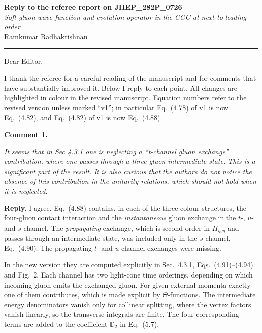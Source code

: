 \documentclass[11pt,a4paper]{article}
\newenvironment{comment}[1]{\par\medskip\noindent\textbf{Comment #1.}\par\vspace{2pt}%
  \begin{list}{}{\leftmargin=12pt\rightmargin=12pt}\item\itshape\small}{\end{list}\vspace{-2pt}}
\newcommand{\reply}{\noindent\textbf{Reply.} }
\begin{document}
\begin{center}
{\large\bfseries Reply to the referee report on JHEP\_282P\_0726}\\[3pt]
\emph{Soft gluon wave function and evolution operator in the CGC at next-to-leading order}\\[2pt]
Ramkumar Radhakrishnan
\end{center}
\vspace{-4pt}\hrule\vspace{6pt}

Dear Editor,

I thank the referee for a careful reading of the manuscript and for comments that have substantially improved it. Below I reply to each point. All changes are highlighted in colour in the revised manuscript. Equation numbers refer to the revised version unless marked ``v1''; in particular Eq.~(4.78) of v1 is now Eq.~(4.82), and Eq.~(4.82) of v1 is now Eq.~(4.88).

\begin{comment}{1}
It seems that in Sec 4.3.1 one is neglecting a ``t-channel gluon exchange'' contribution, where one passes through a three-gluon intermediate state. This is a significant part of the result. It is also curious that the authors do not notice the absence of this contribution in the unitarity relations, which should not hold when it is neglected.
\end{comment}

\reply I agree. Eq.~(4.88) contains, in each of the three colour structures, the four-gluon contact interaction and the \emph{instantaneous} gluon exchange in the $t$-, $u$- and $s$-channel. The \emph{propagating} exchange, which is second order in $H_{ggg}$ and passes through an intermediate state, was included only in the $s$-channel, Eq.~(4.90). The propagating $t$- and $u$-channel exchanges were missing.

In the new version they are computed explicitly in Sec.~4.3.1, Eqs.~(4.91)--(4.94) and Fig.~2. Each channel has two light-cone time orderings, depending on which incoming gluon emits the exchanged gluon. For given external momenta exactly one of them contributes, which is made explicit by $\Theta$-functions. The intermediate energy denominators vanish only for collinear splitting, where the vertex factors vanish linearly, so the transverse integrals are finite. The four corresponding terms are added to the coefficient $\mathbb{D}_{2}$ in Eq.~(5.7).
\end{document}
